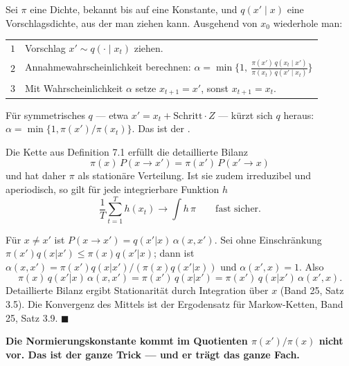 \begin{definition}
Sei $\pi$ eine Dichte, bekannt bis auf eine Konstante, und $q(x'\mid x)$ eine Vorschlagsdichte, aus der man ziehen kann. Ausgehend von $x_0$ wiederhole man:
\begin{center}
{\small
\renewcommand{\arraystretch}{1.5}
\begin{tabular}{@{}P{0.8cm}P{7.6cm}@{}}
\toprule
$1$ & Vorschlag $x' \sim q(\cdot\mid x_t)$ ziehen.\\
$2$ & Annahmewahrscheinlichkeit berechnen:
$\displaystyle \alpha = \min\Big\{1,\ \frac{\pi(x')\,q(x_t\mid x')}{\pi(x_t)\,q(x'\mid x_t)}\Big\}$\\
$3$ & Mit Wahrscheinlichkeit $\alpha$ setze $x_{t+1} = x'$, sonst $x_{t+1} = x_t$.\\
\bottomrule
\end{tabular}}
\end{center}
Für symmetrisches $q$ --- etwa $x' = x_t + \text{Schritt}\cdot Z$ --- kürzt sich $q$ heraus: $\alpha = \min\{1, \pi(x')/\pi(x_t)\}$. Das ist der .
\end{definition}

\begin{merksatz}
Die Kette aus Definition 7.1 erfüllt die detaillierte Bilanz
\[ \pi(x)\,P(x\to x') = \pi(x')\,P(x'\to x) \]
und hat daher $\pi$ als stationäre Verteilung. Ist sie zudem irreduzibel und aperiodisch, so gilt für jede integrierbare Funktion $h$
\[ \frac1T\sum_{t=1}^T h(x_t) \longrightarrow \int h\,\pi \qquad \text{fast sicher.} \]

Für $x\neq x'$ ist $P(x\to x') = q(x'|x)\,\alpha(x,x')$. Sei ohne Einschränkung $\pi(x')q(x|x') \le \pi(x)q(x'|x)$; dann ist $\alpha(x,x') = \pi(x')q(x|x')/(\pi(x)q(x'|x))$ und $\alpha(x',x) = 1$. Also
\[ \pi(x)\,q(x'|x)\,\alpha(x,x') = \pi(x')\,q(x|x') = \pi(x')\,q(x|x')\,\alpha(x',x) . \]
Detaillierte Bilanz ergibt Stationarität durch Integration über $x$ (Band 25, Satz 3.5). Die Konvergenz des Mittels ist der Ergodensatz für Markow-Ketten, Band 25, Satz 3.9. $\blacksquare$

\begin{center}
\begin{minipage}{0.9\textwidth}
\textbf{Die Normierungskonstante kommt im Quotienten $\pi(x')/\pi(x)$ nicht vor. Das ist der ganze Trick --- und er trägt das ganze Fach.}
\end{minipage}
\end{center}

\begin{center}
\begin{minipage}{0.88\textwidth}
\end{minipage}
\end{center}
\end{merksatz}

